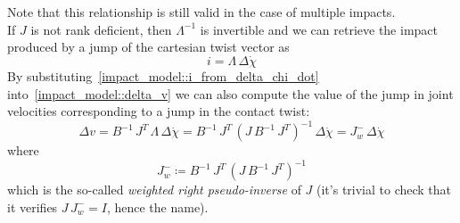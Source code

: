 \documentclass[letterpaper, 10 pt, conference]{ieeeconf}  %
\begin{document}
Note that this relationship is still valid in the case of multiple impacts. \\
If $J$ is not rank deficient, then $\Lambda^{-1}$ is invertible and we can retrieve the impact produced by a jump of the cartesian twist vector as
 \begin{equation}\label{impact_model::i_from_delta_chi_dot}
i = \Lambda\,\Delta\dot{\chi}
\end{equation}
By substituting~\eqref{impact_model::i_from_delta_chi_dot} into~\eqref{impact_model::delta_v} we can also compute the value of the jump in joint velocities corresponding to a jump in the contact twist:
\begin{dmath}\label{impact_model::delta_v_from_delta_chi_dot}
\Delta v = B^{-1}\,J^T\,\Lambda\,\Delta\dot{\chi} = B^{-1}\,J^T\,{( J\, B^{-1}\,J^T)}^{-1}\,\Delta\dot{\chi}
= {J^{-}_{w}}\,\Delta\dot{\chi}
\end{dmath}
where 
\begin{equation}\label{impact_model::J_rpi}
J^{-}_{w}\coloneqq B^{-1}\,J^T\,{( J\, B^{-1}\,J^T)}^{-1}
\end{equation}
which is the so-called \textit{weighted right pseudo-inverse} of $J$ (it's trivial to check that it verifies $J\,J^{-}_{w} = I$, hence the name).
\end{document}
